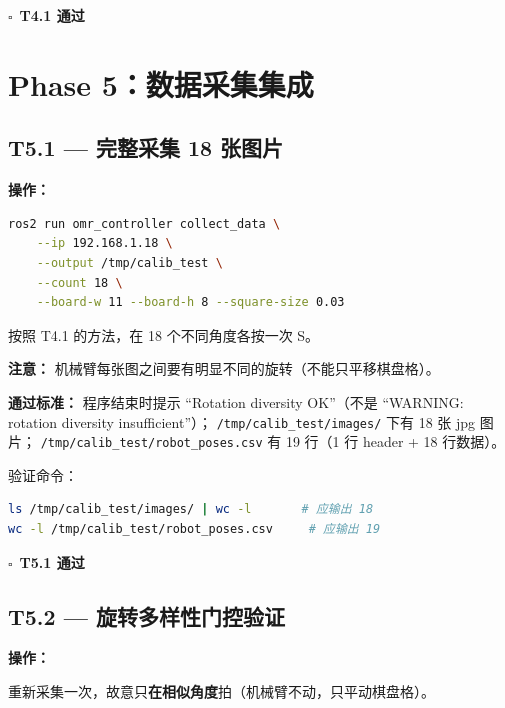 \documentclass[12pt,a4paper,fontset=ubuntu]{ctexart}
\newcommand{\chkbox}{$\square$}
\newcommand{\passcriteria}[1]{%
  \textbf{通过标准：} #1%
}
\begin{document}
\begin{center}\chkbox\ \textbf{T4.1 通过}\end{center}

\section{Phase 5：数据采集集成}

\subsection{T5.1 — 完整采集 18 张图片}

\textbf{操作：}

\begin{lstlisting}[language=bash]
ros2 run omr_controller collect_data \
    --ip 192.168.1.18 \
    --output /tmp/calib_test \
    --count 18 \
    --board-w 11 --board-h 8 --square-size 0.03
\end{lstlisting}

按照 T4.1 的方法，在 18 个不同角度各按一次 S。

\begin{warnbox}
\textbf{注意：} 机械臂每张图之间要有明显不同的旋转（不能只平移棋盘格）。
\end{warnbox}

\passcriteria{
  程序结束时提示 ``Rotation diversity OK''（不是 ``WARNING: rotation diversity insufficient''）；
  \texttt{/tmp/calib\_test/images/} 下有 18 张 jpg 图片；
  \texttt{/tmp/calib\_test/robot\_poses.csv} 有 19 行（1 行 header + 18 行数据）。
}

验证命令：
\begin{lstlisting}[language=bash]
ls /tmp/calib_test/images/ | wc -l       # 应输出 18
wc -l /tmp/calib_test/robot_poses.csv     # 应输出 19
\end{lstlisting}

\begin{center}\chkbox\ \textbf{T5.1 通过}\end{center}


\subsection{T5.2 — 旋转多样性门控验证}

\textbf{操作：}

重新采集一次，故意只\textbf{在相似角度}拍（机械臂不动，只平动棋盘格）。
\end{document}

